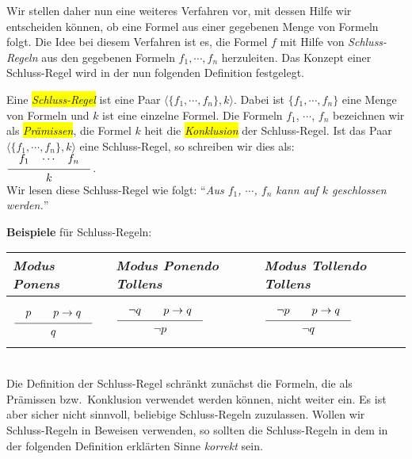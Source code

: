 Wir stellen daher nun eine weiteres Verfahren vor, mit dessen Hilfe wir entscheiden
k\"{o}nnen, ob eine Formel aus einer gegebenen Menge von Formeln folgt.  Die Idee bei diesem Verfahren
ist es, die Formel $f$ mit Hilfe von \emph{Schluss-Regeln} aus den gegebenen Formeln 
$f_1, \cdots, f_n$ herzuleiten.
  Das Konzept einer Schluss-Regel wird in der nun folgenden Definition festgelegt.
\begin{Definition}
    Eine \colorbox{yellow}{\emph{Schluss-Regel}} ist eine Paar  $\langle \{f_1, \cdots, f_n\}, k \rangle$.
    Dabei ist 
    $\{f_1, \cdots, f_n\}$ eine Menge von Formeln und $k$ ist eine einzelne Formel.  
    Die Formeln $f_1$, $\cdots$, $f_n$ bezeichnen wir als
    \colorbox{yellow}{\emph{Pr\"{a}missen}}, die Formel $k$ hei\3t die \colorbox{yellow}{\emph{Konklusion}} der Schluss-Regel.
    Ist das Paar 
    $\langle \{f_1, \cdots, f_n\}, k \rangle$ eine Schluss-Regel, so schreiben wir
    dies als: 
    \\[0.3cm]
    \hspace*{1.3cm}      
    $\schluss{f_1 \quad \cdots \quad f_n}{k}$.
    \\[0.3cm]
    Wir lesen diese Schluss-Regel wie folgt: 
    ``\textsl{Aus $f_1$, $\cdots$, $f_n$ kann auf $k$ geschlossen werden.}''
    \eox
\end{Definition}
\vspace*{0.3cm}

\noindent
\textbf{Beispiele} f\"{u}r Schluss-Regeln: 
\\[0.2cm]
\hspace*{1.3cm}            
\begin{tabular}[t]{|l|l|l|}
\hline
\rule{0pt}{15pt} \emph{Modus Ponens} & \emph{Modus Ponendo Tollens} & \emph{Modus Tollendo Tollens} \\[0.3cm]
\hline
$
\rule[-15pt]{0pt}{40pt}\schluss{p \quad\quad p \rightarrow q}{q}$ &
$\schluss{\neg q \quad\quad p \rightarrow q}{\neg p}$ &
$\schluss{\neg p \quad\quad p \rightarrow q}{\neg q}$ \\[0.3cm]
\hline
\end{tabular}
\\[0.3cm]

\noindent
Die Definition der Schluss-Regel schr\"{a}nkt zun\"{a}chst die Formeln, die als Pr\"{a}missen
bzw.~Konklusion verwendet werden k\"{o}nnen, nicht weiter ein.  Es ist aber sicher nicht
sinnvoll, beliebige Schluss-Regeln zuzulassen.  Wollen wir Schluss-Regeln in Beweisen
verwenden, so sollten die Schluss-Regeln in dem in der folgenden Definition erkl\"{a}rten
Sinne \emph{korrekt} sein.

